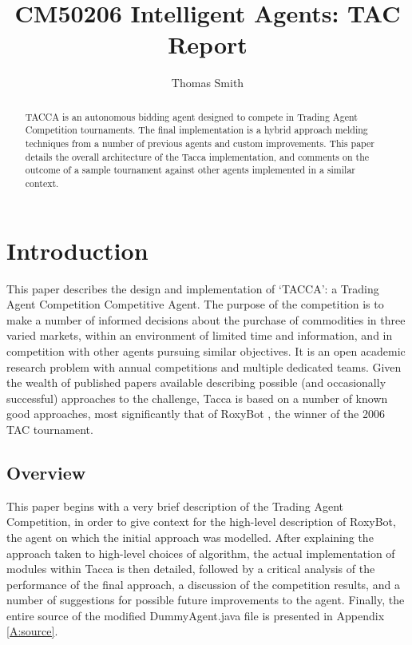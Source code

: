 \documentclass[oribibl]{llncs}
\begin{document}
\title{CM50206 Intelligent Agents: TAC Report}


\author{Thomas Smith}
\maketitle

\begin{abstract}
TACCA is an autonomous bidding agent designed to compete in Trading Agent Competition tournaments. The final implementation is a hybrid approach melding techniques from a number of previous agents and custom improvements. This paper details the overall architecture of the Tacca implementation, and comments on the outcome of a sample tournament against other agents implemented in a similar context.
\end{abstract}

\section{Introduction}
This paper describes the design and implementation of `TACCA': a Trading Agent Competition Competitive Agent. The purpose of the competition is to make a number of informed decisions about the purchase of commodities in three varied markets, within an environment of limited time and information, and in competition with other agents pursuing similar objectives. It is an open academic research problem with annual competitions and multiple dedicated teams. Given the wealth of published papers available describing possible (and occasionally successful) approaches to the challenge, Tacca is based on a number of known good approaches, most significantly that of RoxyBot \cite{greenwald2009roxybot}, the winner of the 2006 TAC tournament.

\subsection{Overview}
This paper begins with a very brief description of the Trading Agent Competition, in order to give context for the high-level description of RoxyBot, the agent on which the initial approach was modelled. After explaining the approach taken to high-level choices of algorithm, the actual implementation of modules within Tacca is then detailed, followed by a critical analysis of the performance of the final approach, a discussion of the competition results, and a number of suggestions for possible future improvements to the agent. Finally, the entire source of the modified DummyAgent.java file is presented in Appendix \ref{A:source}.
\end{document}

